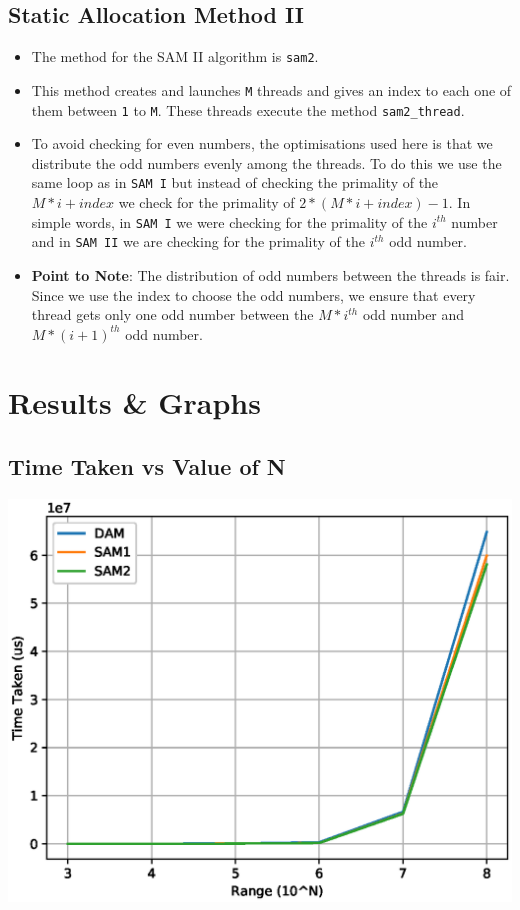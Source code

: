 \documentclass[a4paper,12pt]{report}
\begin{document}
\subsection{Static Allocation Method II}
\begin{itemize}
\item The method for the SAM II algorithm is \texttt{sam2}.
\item This method creates and launches \texttt{M} threads and gives an index to each one of them between \texttt{1} to \texttt{M}. These threads execute the method \texttt{sam2\_thread}.
\item To avoid checking for even numbers, the optimisations used here is that we distribute the odd numbers evenly among the threads. To do this we use the same loop as in \texttt{SAM I} but instead of checking the primality of the $M*i + index$ we check for the primality of $2*(M*i + index)-1$. In simple words, in \texttt{SAM I} we were checking for the primality of the $i^{th}$ number and in \texttt{SAM II} we are checking for the primality of the $i^{th}$ odd number.
\item \textbf{Point to Note}: The distribution of odd numbers between the threads is fair. Since we use the index to choose the odd numbers, we ensure that every thread gets only one odd number between the $M*i^{th}$ odd number and $M*(i+1)^{th}$ odd number.
\end{itemize}
\newpage
\section{Results \& Graphs}
\subsection{Time Taken vs Value of N}
\begin{center}
\begin{large}
\end{large}
\includegraphics[scale=0.7]{./constantM.eps}
\end{center}
\end{document}
